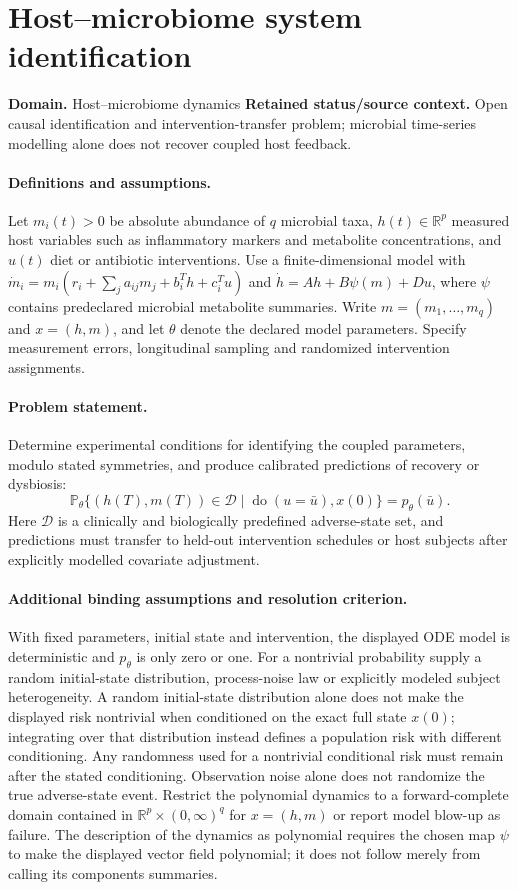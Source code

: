\documentclass[11pt]{article}
\begin{document}
\section*{Host–microbiome system identification}
\label{prob:057}
\label{rank:24}
\par\smallskip

\noindent\textbf{Domain.} Host--microbiome dynamics \quad \textbf{Retained status/source context.} Open causal identification and intervention-transfer problem; microbial time-series modelling alone does not recover coupled host feedback.
\paragraph{Definitions and assumptions.} Let $m_i(t)>0$ be absolute abundance of $q$ microbial taxa, $h(t)\in\mathbb{R}^p$ measured host variables such as inflammatory markers and metabolite concentrations, and $u(t)$ diet or antibiotic interventions. Use a finite-dimensional model with $\dot m_i=m_i(r_i+\sum_j a_{ij}m_j+b_i^T h+c_i^T u)$ and $\dot h=Ah+B\psi(m)+Du$, where $\psi$ contains predeclared microbial metabolite summaries. Write $m=(m_1,\ldots,m_q)$ and $x=(h,m)$, and let $\theta$ denote the declared model parameters. Specify measurement errors, longitudinal sampling and randomized intervention assignments.
\paragraph{Problem statement.} Determine experimental conditions for identifying the coupled parameters, modulo stated symmetries, and produce calibrated predictions of recovery or dysbiosis:
\[\mathbb{P}_{\theta}\{(h(T),m(T))\in\mathcal D\mid\operatorname{do}(u=\bar u),x(0)\}=p_\theta(\bar u).\]
Here $\mathcal D$ is a clinically and biologically predefined adverse-state set, and predictions must transfer to held-out intervention schedules or host subjects after explicitly modelled covariate adjustment.
\paragraph{Additional binding assumptions and resolution criterion.} With fixed parameters, initial state and intervention, the displayed ODE model is deterministic and $p_\theta$ is only zero or one. For a nontrivial probability supply a random initial-state distribution, process-noise law or explicitly modeled subject heterogeneity. A random initial-state distribution alone does not make the displayed risk nontrivial when conditioned on the exact full state $x(0)$; integrating over that distribution instead defines a population risk with different conditioning. Any randomness used for a nontrivial conditional risk must remain after the stated conditioning. Observation noise alone does not randomize the true adverse-state event. Restrict the polynomial dynamics to a forward-complete domain contained in $\mathbb R^p\times(0,\infty)^q$ for $x=(h,m)$ or report model blow-up as failure. The description of the dynamics as polynomial requires the chosen map $\psi$ to make the displayed vector field polynomial; it does not follow merely from calling its components summaries.
\end{document}
